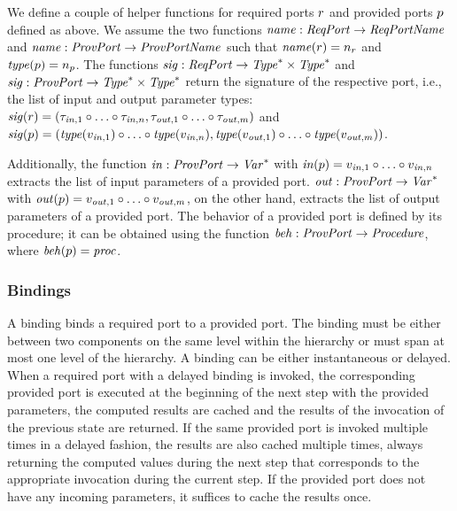 \documentclass[a4paper,10pt,english]{article}
\begin{document}
We define a couple of helper functions for required ports $r$ and provided ports $p$ defined as above. We assume
the two functions $\mathit{name} : \mathit{ReqPort} \rightarrow \mathit{ReqPortName}$ and $\mathit{name} : \mathit{ProvPort} \rightarrow \mathit{ProvPortName}$ such that
$\mathit{name}(r) = n_r$ and $\mathit{type}(p) = n_p$.
The functions $\mathit{sig} :
\mathit{ReqPort} \rightarrow \mathit{Type}^* \times \mathit{Type}^*$ and $\mathit{sig} : \mathit{ProvPort} \rightarrow \mathit{Type}^* \times
\mathit{Type}^*$ return the signature of the respective port, i.e., the list of input and output parameter types:
$\mathit{sig}(r) = (\tau_{\mathit{in}, 1} \circ \ldots \circ \tau_{\mathit{in}, n}, \tau_{\mathit{out}, 1} \circ \ldots
\circ \tau_{\mathit{out}, m})$ and $\mathit{sig}(p) = (\mathit{type}(v_{\mathit{in}, 1}) \circ \ldots \circ
\mathit{type}(v_{\mathit{in}, n}), \mathit{type}(v_{\mathit{out}, 1}) \circ \ldots \circ \mathit{type}(v_{\mathit{out}, m}))$.

Additionally, the function $\mathit{in} : \mathit{ProvPort} \rightarrow \mathit{Var}^*$ with $\mathit{in}(p) = v_{\mathit{in}, 1} \circ
\ldots \circ v_{\mathit{in}, n}$ extracts the list of input parameters of a provided port. $\mathit{out} : \mathit{ProvPort} \rightarrow
\mathit{Var}^*$ with $\mathit{out}(p) = v_{\mathit{out}, 1} \circ \ldots \circ v_{\mathit{out}, m}$, on the other hand,
extracts the list of output parameters of a provided port. The behavior of a provided port is defined by its procedure; it can be
obtained using the function $\mathit{beh} : \mathit{ProvPort} \rightarrow
\mathit{Procedure}$, where $\mathit{beh}(p) = \mathit{proc}$.

\subsubsection{Bindings}
A binding binds a required port to a provided port. The binding must be either between two components on the
same level within the hierarchy or must span at most one level of the hierarchy. A binding can be either
instantaneous or delayed. When a required port with a delayed binding is invoked, the corresponding provided port is executed
at the beginning of the next step with the provided parameters, the computed results are cached and the results of the invocation
of the previous state are returned. If the same provided port is invoked multiple times in a delayed fashion, the results are also
cached multiple times, always returning the computed values during the next step that corresponds to the appropriate invocation
during the current step. If the provided port does not have any incoming parameters, it suffices to cache the results once.
\end{document}
